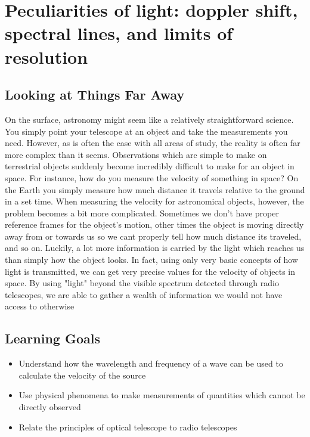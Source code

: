 \chapter{Peculiarities of light: doppler shift, spectral lines, and limits of resolution}



\section{Looking at Things Far Away}
On the surface, astronomy might seem like a relatively straightforward science. You simply point your telescope at an object and take the measurements you need. However, as is often the case with all areas of study, the reality is often far more complex than it seems. Observations which are simple to make on terrestrial objects suddenly become incredibly difficult to make for an object in space. For instance, how do you measure the velocity of something in space? On the Earth you simply measure how much distance it travels relative to the ground in a set time. When measuring the velocity for astronomical objects, however, the problem becomes a bit more complicated. Sometimes we don't have proper reference frames for the object's motion, other times the object is moving directly away from or towards us so we cant properly tell how much distance its traveled, and so on. Luckily, a lot more information is carried by the light which reaches us than simply how the object looks. In fact, using only very basic concepts of how light is transmitted, we can get very precise values for the velocity of objects in space. By using "light" beyond the visible spectrum detected through radio telescopes, we are able to gather a wealth of information we would not have access to otherwise 


\section{Learning Goals}
\begin{itemize}
	\item Understand how the wavelength and frequency of a wave can be used to calculate the velocity of the source
	
	\item Use physical phenomena to make measurements of quantities which cannot be directly observed
	
	\item Relate the principles of optical telescope to radio telescopes
\end{itemize}

